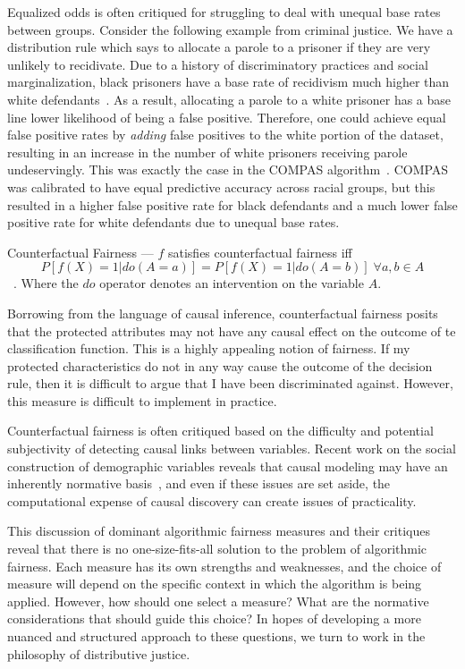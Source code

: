 Equalized odds is often critiqued for struggling to deal with unequal base rates
between groups. Consider the following example from criminal justice. We have a 
distribution rule which says to allocate a parole to a prisoner if they are very
unlikely to recidivate. Due to a history of discriminatory practices and social
marginalization, black prisoners have a base rate of recidivism much higher than
white defendants~\cite{CrimeJustice_2023}. As a result, allocating a parole to 
a white prisoner has a base line lower likelihood of being a false positive. 
Therefore, one could achieve equal false positive rates by \textit{adding} false
positives to the white portion of the dataset, resulting in an increase in the
number of white prisoners receiving parole undeservingly. This was exactly the
case in the COMPAS algorithm~\cite{Angwin_2016}. COMPAS was calibrated to have
equal predictive accuracy across racial groups, but this resulted in a higher
false positive rate for black defendants and a much lower false positive rate
for white defendants due to unequal base rates.

\begin{definition}
    Counterfactual Fairness — $f$ satisfies counterfactual fairness iff
    \[P[f(X) = 1 | do(A = a)] = P[f(X) = 1 | do(A = b)]\;\forall a,
                                                   b \in A\]~\cite{Kusner_2018}.
    Where the $do$ operator denotes an intervention on the variable $A$.
\end{definition}

Borrowing from the language of causal inference, counterfactual fairness posits
that the protected attributes may not have any causal effect on the outcome of
te classification function. This is a highly appealing notion of fairness.
If my protected characteristics do not in any way cause the outcome of the
decision rule, then it is difficult to argue that I have been discriminated
against. However, this measure is difficult to implement in practice.

Counterfactual fairness is often critiqued based on the difficulty and potential
subjectivity of detecting causal links between variables. Recent work on the 
social construction of demographic variables reveals that causal modeling may 
have an inherently normative basis~\cite{Hu_Forthcoming}, and even if these
issues are set aside, the computational expense of causal discovery can create
issues of practicality.

This discussion of dominant algorithmic fairness measures and their critiques
reveal that there is no one-size-fits-all solution to the problem of algorithmic
fairness. Each measure has its own strengths and weaknesses, and the choice of
measure will depend on the specific context in which the algorithm is being
applied. However, how should one select a measure? What are the normative
considerations that should guide this choice? In hopes of developing a more
nuanced and structured approach to these questions, we turn to work in the 
philosophy of distributive justice.

